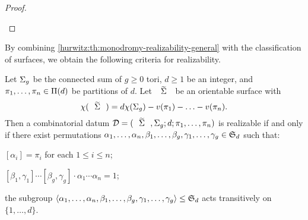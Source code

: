 \begin{proof}
\begin{twoimplications}
\end{twoimplications}
\end{proof}

By combining \cref{hurwitz:th:monodromy-realizability-general} with the classification of surfaces, we obtain the following criteria for realizability.

\bgroup
{}
\begin{corollary}\label{hurwitz:th:monodromy-realizability-orientable}
Let $\Sigma_{g}$ be the connected sum of $g\ge 0$ tori, $d\ge 1$ be an integer, and $\pi_1,\ldots,\pi_n\in\Pi(d)$ be partitions of $d$. Let $\tSigma$ be an orientable surface with
\[
\chi(\tSigma)=d\chi(\surf{g})-v(\pi_1)-\ldots-v(\pi_n).
\]
Then a combinatorial datum $\DD=\datum{\tSigma,\surf{g}}{d}{\pi_1,\ldots,\pi_n}$ is realizable if and only if there exist permutations $\alpha_1,\ldots,\alpha_n,\beta_1,\ldots,\beta_g,\gamma_1,\ldots,\gamma_g\in\symgroup[d]$ such that:
\begin{enumroman}
\item\label{hurwitz:it:monodomy-realizability-orientable-first} $[\alpha_i]=\pi_i$ for each $1\le i\le n$;
\item $[\beta_1,\gamma_1]\cdots[\beta_g,\gamma_g]\cdot\alpha_1\cdots\alpha_n=1$;
\item\label{hurwitz:it:monodomy-realizability-orientable-last} the subgroup $\angled{\alpha_1,\ldots,\alpha_n,\beta_1,\ldots,\beta_g,\gamma_1,\ldots,\gamma_g}\subgroup\symgroup[d]$ acts transitively on $\{1,\ldots,d\}$.
\end{enumroman}
\end{corollary}

